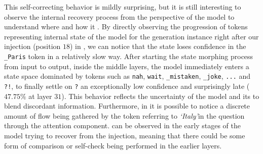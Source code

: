 This self-correcting behavior is mildly surprising, but it is still interesting to observe the internal recovery process from the perspective of the model to understand where and how it .
By directly observing the progression of tokens representing internal state of the model for the generation instance right after our injection (position $18$) in , we can notice that the state loses confidence in the \texttt{\_Paris} token in a relatively slow way.
After starting the state morphing process from input to output, inside the middle layers, the model immediately enters a state space dominated by tokens such as \texttt{nah}, \texttt{wait}, \texttt{\_mistaken}, \texttt{\_joke}, \texttt{...} and \texttt{?!}, to finally settle on \texttt{?}  an exceptionally low confidence and surprisingly late ($47.75\%$ at layer $31$).
This behavior reflects the uncertainty of the model and its  to blend discordant information.
Furthermore, in  it is possible to notice a discrete amount of flow being gathered by the token referring to \emph{`Italy'}in the question through the attention component.
 can be observed in the early stages of the model trying to recover from the injection, meaning that there could be some form of comparison or self-check being performed in the earlier layers.

\begin{figure}[t!]
    \centering
    \quad
    \label{fig:exp_intravisto_4_F}
\end{figure}


